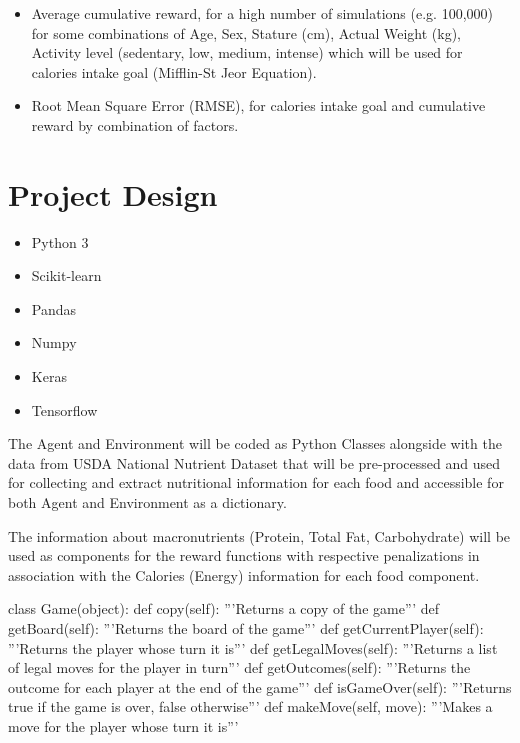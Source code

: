 \documentclass{article}
\begin{document}
\begin{itemize}
    \item Average cumulative reward, for a high number of simulations (e.g. 100,000) for 
    some combinations of Age, Sex, Stature (cm), Actual Weight (kg), Activity level 
    (sedentary, low, medium, intense) which will be used for calories intake goal 
    (Mifflin-St Jeor Equation).
    \item Root Mean Square Error (RMSE), for calories intake goal and cumulative 
    reward by combination of factors.
\end{itemize}

\section{Project Design}

\begin{itemize}
    \item Python 3
    \item Scikit-learn
    \item Pandas
    \item Numpy
    \item Keras
    \item Tensorflow
\end{itemize}

The Agent and Environment will be coded as Python Classes alongside with the data from 
USDA National Nutrient Dataset that will be pre-processed and used for collecting and 
extract nutritional information for each food and accessible for both Agent and 
Environment as a dictionary. 

The information about macronutrients (Protein, Total Fat, Carbohydrate) will be 
used as components for the reward functions with respective penalizations in 
association with the Calories (Energy) information for each food component.

\begin{python}
	class Game(object):
	def copy(self):
	'''Returns a copy of the game'''
	def getBoard(self):
	'''Returns the board of the game'''
	def getCurrentPlayer(self):
	'''Returns the player whose turn it is'''
	def getLegalMoves(self):
	'''Returns a list of legal moves for the player in turn'''
	def getOutcomes(self):
	'''Returns the outcome for each player at the end of the game'''
	def isGameOver(self):
	'''Returns true if the game is over, false otherwise'''
	def makeMove(self, move):
	'''Makes a move for the player whose turn it is'''
\end{python}



\end{document}
